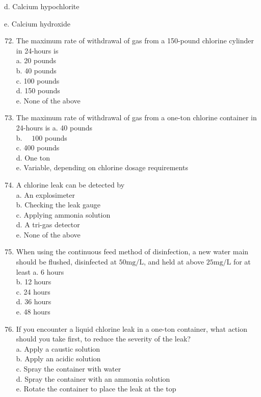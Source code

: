\documentclass[10pt]{article}
\begin{document}
\begin{enumerate}
\begin{enumerate}
d. Calcium hypochlorite

e. Calcium hydroxide

\begin{enumerate}
  \setcounter{enumi}{71}
  \item The maximum rate of withdrawal of gas from a 150-pound chlorine cylinder in 24-hours is\\
a. 20 pounds\\
b. 40 pounds\\
c. 100 pounds\\
d. 150 pounds\\
e. None of the above\\

  \item The maximum rate of withdrawal of gas from a one-ton chlorine container in 24-hours is
a. 40 pounds\\
b. $\quad 100$ pounds\\
c. 400 pounds\\
d. One ton\\
e. Variable, depending on chlorine dosage requirements\\

  \item A chlorine leak can be detected by\\
a. An explosimeter\\
b. Checking the leak gauge\\
c. Applying ammonia solution\\
d. A tri-gas detector\\
e. None of the above\\

  \item When using the continuous feed method of disinfection, a new water main should be flushed, disinfected at $50 \mathrm{mg} / \mathrm{L}$, and held at above $25 \mathrm{mg} / \mathrm{L}$ for at least
a. 6 hours\\
b. 12 hours\\
c. 24 hours\\
d. 36 hours\\
e. 48 hours\\

  \item If you encounter a liquid chlorine leak in a one-ton container, what action should you take first, to reduce the severity of the leak?\\
a. Apply a caustic solution\\
b. Apply an acidic solution\\
c. Spray the container with water\\
d. Spray the container with an ammonia solution\\
e. Rotate the container to place the leak at the top\\


\end{enumerate}
\end{enumerate}
\end{enumerate}
\end{document}

